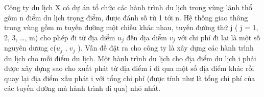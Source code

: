 Công ty du lịch X có dự án tổ chức các hành trình du lịch trong vùng lãnh thổ gồm n điểm du lịch trọng điểm, được đánh số từ 1 tới n. Hệ thống giao thông trong vùng gồm m tuyến đường một chiều khác nhau, tuyến đường thứ j ( j = 1, 2, 3, …, m) cho phép đi từ địa diểm $u_{j}$ đến dịa diểm $v_{j}$ với chi phí đi lại là một số nguyên dương c($u_{j}$ , $v_{j}$ ). Vấn đề đặt ra cho công ty là xây dựng các hành trình du lịch cho mỗi điểm du lịch. Một hành trình du lịch cho địa điểm du lịch i phải được xây dựng sao cho xuất phát từ địa điểm i đi qua một số địa điểm khác rồi quay lại địa điểm xấu phát i với tổng chi phí (được tính như là tổng chi phí của các tuyến đường mà hành trình đi qua) nhỏ nhất.